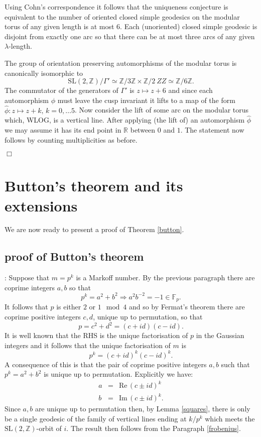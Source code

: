 \documentclass[12pt,a4paper]{amsart}
\def\ZZ{\mathbb{Z}}
\def\RR{\mathbb{R}}
\def\fp{\mathbb{F}_p}
\def\sl2{\mathrm{SL}(2, \ZZ)}
\begin{document}
Using Cohn's correspondence it follows that the uniqueness conjecture is equivalent
to the number of oriented closed simple geodesics on the modular torus of any
given length is at most 6. Each (unoriented) closed simple geodesic is disjoint
from exactly one arc so that there can be at most three arcs of any given
$\lambda$-length.

The group of orientation preserving  automorphisms of the modular torus 
is canonically isomorphic to 
$$\sl2 / \Gamma' \simeq \ZZ/3\ZZ \times \ZZ/2\ ZZ \simeq \ZZ/6\ZZ .$$
The commutator of the generators of $ \Gamma'$  is $z \mapsto z + 6$
and since each automorphism $\phi$ must leave the cusp invariant it lifts to
a map of the form $\hat{\phi} : z \mapsto z + k,\, k= 0,\dots 5$.
Now consider the lift of some arc on the modular torus 
which, WLOG, is a vertical line. 
After applying (the lift of)  an automorphism $\hat{\phi}$ 
we may assume it has its end point in $\RR$ between $0$ and $1$.
The statement now follows by counting multiplicities as before.

\hfill $\Box$


\section{Button's theorem and its extensions}

We are now ready to present a proof of Theorem \ref{button}.

 
\subsection{proof of Button's theorem}

 \proof: Suppose that $m=p^k$ is a Markoff number. By the previous paragraph there are coprime integers $a,b$ so that 
$$p^k = a^2 + b^2 \Rightarrow a^2b^{-2} = -1 \in \fp.$$
It follows that $p$ is either $2$ or $1 \mod 4$ and 
so by Fermat's theorem  there are coprime positive integers $c,d$,
 unique up to permutation,
so that  $$p = c^2 + d^2 = (c + id)(c - id).$$
It is well known that the RHS is the unique factorisation of $p$ in the Gaussian integers
and it follows that the unique factorisation of $m$ is
$$p^k = (c + id)^k(c - id)^k.$$
A consequence of this is that the pair of coprime positive integers $a,b$ such that $p^k = a^2 + b^2$
is unique up to permutation. Explicitly we have:
\begin{eqnarray}
a &=& \mathrm{Re}\, (c\pm id)^k \\
b &=& \mathrm{Im}\, (c\pm id)^k.
\end{eqnarray}
Since $a,b$ are unique up to permutation 
then, by Lemma \ref{squares},
 there is only be a single  geodesic of the family
of vertical lines ending at  
$k/p^k$ which meets the $\sl2$-orbit of $i$.
The result then follows from the  Paragraph \ref{frobenius}.
\end{document}
